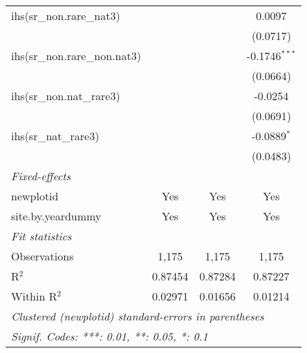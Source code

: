 \begin{table}[htbp]
\begin{tabular}{lccc}
      ihs(sr\_non.rare\_nat3)       &                 &                 & 0.0097\\   
                                    &                 &                 & (0.0717)\\   
      ihs(sr\_non.rare\_non.nat3)   &                 &                 & -0.1746$^{***}$\\   
                                    &                 &                 & (0.0664)\\   
      ihs(sr\_non.nat\_rare3)       &                 &                 & -0.0254\\   
                                    &                 &                 & (0.0691)\\   
      ihs(sr\_nat\_rare3)           &                 &                 & -0.0889$^{*}$\\   
                                    &                 &                 & (0.0483)\\   
      \midrule
      \emph{Fixed-effects}\\
      newplotid                     & Yes             & Yes             & Yes\\  
      site.by.yeardummy             & Yes             & Yes             & Yes\\  
      \midrule
      \emph{Fit statistics}\\
      Observations                  & 1,175           & 1,175           & 1,175\\  
      R$^2$                         & 0.87454         & 0.87284         & 0.87227\\  
      Within R$^2$                  & 0.02971         & 0.01656         & 0.01214\\  
      \midrule \midrule
      \multicolumn{4}{l}{\emph{Clustered (newplotid) standard-errors in parentheses}}\\
      \multicolumn{4}{l}{\emph{Signif. Codes: ***: 0.01, **: 0.05, *: 0.1}}\\
   \end{tabular}
\end{table}


